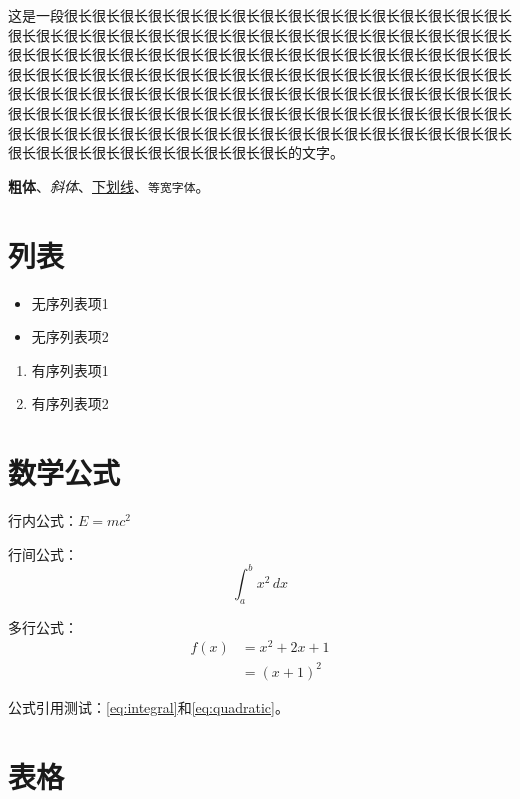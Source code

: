这是一段很长很长很长很长很长很长很长很长很长很长很长很长很长很长很长很长很长很长很长很长很长很长很长很长很长很长很长很长很长很长很长很长很长很长很长很长很长很长很长很长很长很长很长很长很长很长很长很长很长很长很长很长很长很长很长很长很长很长很长很长很长很长很长很长很长很长很长很长很长很长很长很长很长很长很长很长很长很长很长很长很长很长很长很长很长很长很长很长很长很长很长很长很长很长很长很长很长很长很长很长很长很长很长很长很长很长很长很长很长很长很长很长很长很长很长很长很长很长很长很长很长很长很长很长很长很长很长很长很长很长很长很长很长很长的文字。

\textbf{粗体}、\textit{斜体}、\underline{下划线}、\texttt{等宽字体}。

\section{列表}
\begin{itemize}
    \item 无序列表项1
    \item 无序列表项2
\end{itemize}

\begin{enumerate}
    \item 有序列表项1
    \item 有序列表项2
\end{enumerate}

\section{数学公式}
行内公式：$E=mc^2$

行间公式：
\begin{equation}
  \int_{a}^{b} x^2 \,dx
  \label{eq:integral}
\end{equation}

多行公式：
\begin{equation}
    \begin{aligned}
        f(x) &= x^2 + 2x + 1 \\
             &= (x + 1)^2
    \end{aligned}
    \label{eq:quadratic}
\end{equation}

公式引用测试：\eqref{eq:integral}和\eqref{eq:quadratic}。

\section{表格}

